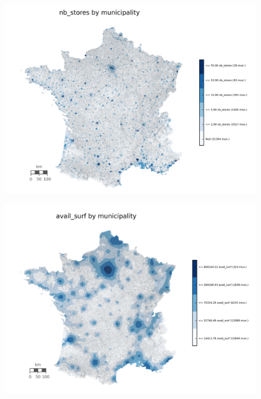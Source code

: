 \documentclass[11pt]{article}
\begin{document}
\begin{figure}[H]
	\centering
		\includegraphics[width=14cm]{images/maps_competition/fra_com_nb_stores.png}
\end{figure}

\begin{figure}[H]
	\centering
		\includegraphics[width=14cm]{images/maps_competition/fra_com_avail_surf.png}
\end{figure}
\end{document}

